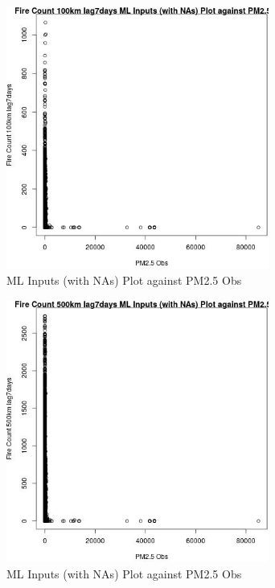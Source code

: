 \begin{figure} 
\centering  
\includegraphics[width=0.77\textwidth]{Code_Outputs/Report_ML_input_PM25_Step4_part_f_de_duplicated_aveswNAs_Fire_Count_100km_lag7daysvPM25_Obs.jpg} 
\caption{\label{fig:Report_ML_input_PM25_Step4_part_f_de_duplicated_aveswNAsFire_Count_100km_lag7daysvPM25_Obs}ML Inputs (with NAs) Plot against PM2.5 Obs} 
\end{figure} 
 

\begin{figure} 
\centering  
\includegraphics[width=0.77\textwidth]{Code_Outputs/Report_ML_input_PM25_Step4_part_f_de_duplicated_aveswNAs_Fire_Count_500km_lag7daysvPM25_Obs.jpg} 
\caption{\label{fig:Report_ML_input_PM25_Step4_part_f_de_duplicated_aveswNAsFire_Count_500km_lag7daysvPM25_Obs}ML Inputs (with NAs) Plot against PM2.5 Obs} 
\end{figure} 
 

